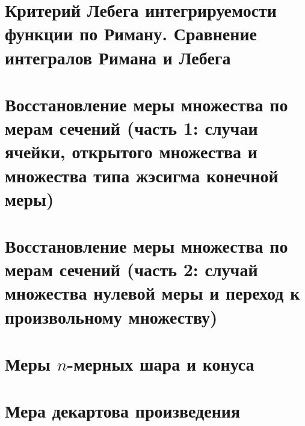 \documentclass[12pt, a4paper, oneside]{memoir}
\begin{document}
\section{Критерий Лебега интегрируемости функции по Риману. Сравнение интегралов Римана и Лебега}
\section{Восстановление меры множества по мерам сечений (часть 1: случаи ячейки, открытого множества и множества типа жэсигма конечной меры)}
\section{Восстановление меры множества по мерам сечений (часть 2: случай множества нулевой меры и переход к произвольному множеству)}
\section{Меры $n$-мерных шара и конуса}
\section{Мера декартова произведения}
\end{document}
